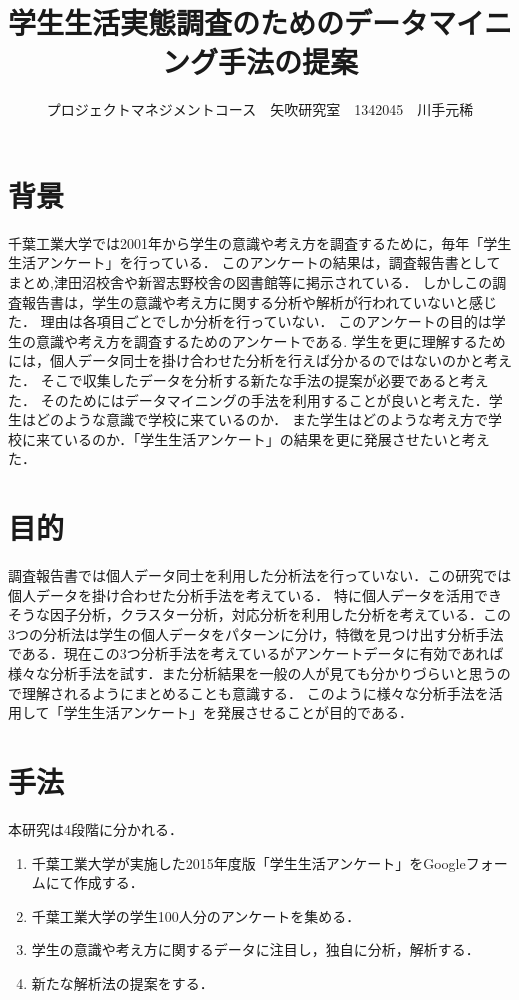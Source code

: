 \documentclass[uplatex,twocolumn,dvipdfmx]{jsarticle}
\title{\vspace{-5mm}\fontsize{14pt}{0pt}\selectfont 学生生活実態調査のためのデータマイニング手法の提案}
\author{\normalsize プロジェクトマネジメントコース　矢吹研究室　1342045　川手元稀}
\date{}
\begin{document}
\fontsize{10.5pt}{\baselineskip}\selectfont
\maketitle





\section{背景}
千葉工業大学では2001年から学生の意識や考え方を調査するために，毎年「学生生活アンケート」を行っている．
このアンケートの結果は，調査報告書としてまとめ,津田沼校舎や新習志野校舎の図書館等に掲示されている．
しかしこの調査報告書は，学生の意識や考え方に関する分析や解析が行われていないと感じた．
理由は各項目ごとでしか分析を行っていない．
このアンケートの目的は学生の意識や考え方を調査するためのアンケートである\cite{a}.
学生を更に理解するためには，個人データ同士を掛け合わせた分析を行えば分かるのではないのかと考えた．
そこで収集したデータを分析する新たな手法の提案が必要であると考えた．
そのためにはデータマイニングの手法を利用することが良いと考えた．学生はどのような意識で学校に来ているのか．
また学生はどのような考え方で学校に来ているのか．「学生生活アンケート」の結果を更に発展させたいと考えた．


\section{目的}
調査報告書では個人データ同士を利用した分析法を行っていない．この研究では個人データを掛け合わせた分析手法を考えている．
特に個人データを活用できそうな因子分析，クラスター分析，対応分析を利用した分析を考えている．この3つの分析法は学生の個人データをパターンに分け，特徴を見つけ出す分析手法である\cite{b}．現在この3つ分析手法を考えているがアンケートデータに有効であれば様々な分析手法を試す．また分析結果を一般の人が見ても分かりづらいと思うので理解されるようにまとめることも意識する．
このように様々な分析手法を活用して「学生生活アンケート」を発展させることが目的である．

\section{手法}
本研究は4段階に分かれる．

\begin{enumerate}
\item 千葉工業大学が実施した2015年度版「学生生活アンケート」をGoogleフォームにて作成する．
\item 千葉工業大学の学生100人分のアンケートを集める．
\item 学生の意識や考え方に関するデータに注目し，独自に分析，解析する．
\item 新たな解析法の提案をする．
\end{enumerate}
\end{document}
